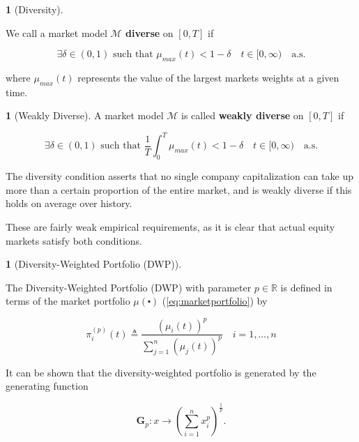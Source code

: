 \documentclass[british]{amsart}
\numberwithin{equation}{section}
\numberwithin{figure}{section}
\theoremstyle{plain}
\theoremstyle{definition}
\newtheorem{defn}[thm]{\protect\definitionname}
\theoremstyle{plain}
\theoremstyle{plain}
\theoremstyle{plain}
\theoremstyle{remark}
\theoremstyle{plain}
\providecommand{\definitionname}{Definition}
\newcommand{\ranget}{t\in[0,\infty)}
\newcommand{\almostsurely}{\text{a.s.}}
\newcommand{\rangei}{i=1,\dots,n}
\begin{document}
\begin{defn} [Diversity] \label{def:diversity}

  We call a market model \textbf{$\mathcal{M}$ diverse }on $[0,T]$ if 

  \begin{equation} \exists \delta \in(0,1) \text{ such that }
\mu_{max}(t)<1-\delta \quad \ranget \quad \almostsurely \end{equation}

  where $\mu_{max}(t)$ represents the value of the largest markets weights at a
given time. 

\end{defn}

\begin{defn} [Weakly Diverse] A market model\textbf{ $\mathcal{M}$} is called
\textbf{weakly diverse} on $[0,T]$ if 

  \begin{equation} \exists \delta \in(0,1) \text{ such that } \frac{1}{T}
\int_{0}^{T} \mu_{max}(t) < 1-\delta \quad \ranget \quad \almostsurely
\end{equation}

\end{defn}

The diversity condition asserts that no single company capitalization can take
up more than a certain proportion of the entire market, and is weakly diverse if
this holds on average over history.

These are fairly weak empirical requirements, as it is clear that actual equity
markets satisfy both conditions.

\begin{defn} [Diversity-Weighted Portfolio (DWP)]
\label{defn:diversityweightedportfolio}

  The Diversity-Weighted Portfolio (DWP) with parameter $p\in\mathbb{R}$ is
defined in terms of the market portfolio $\mu(\centerdot)$
(\ref{eq:marketportfolio}) by

  \begin{equation} \label{eq:diversityweightedportfolio} \pi_{i}^{(p)}(t)
\triangleq \frac{\left( \mu_{i}(t) \right)^{p}} {\sum_{j=1}^{n} \left(
\mu_{j}(t) \right)^{p} } \quad \rangei \end{equation} \end{defn}

It can be shown that the diversity-weighted portfolio is generated by the
generating function

  \begin{equation}
\mathbf{G}_{p}:x\to\left(\sum_{i=1}^{n}x_{i}^{p}\right)^{\frac{1}{p}}.
\end{equation}
\end{document}

